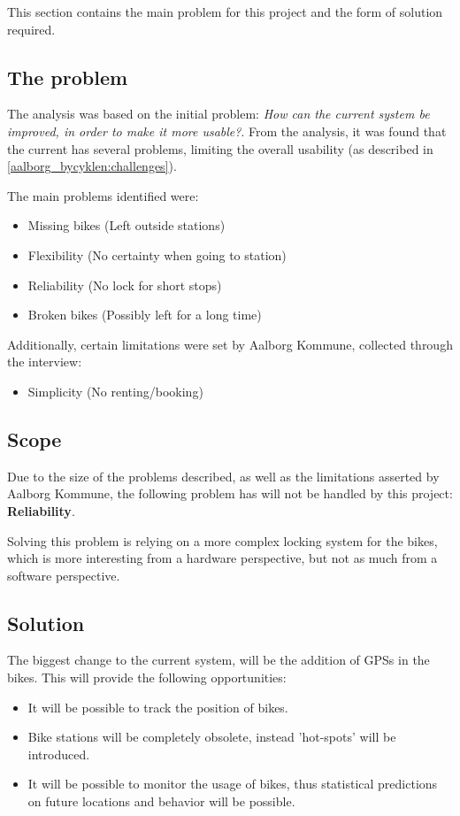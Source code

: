 This section contains the main problem for this project and the form of solution required.

\subsection{The problem}
The analysis was based on the initial problem: \textit{How can the current \citybike system be improved, in order to make it more usable?}.
From the analysis, it was found that the current \citybike has several problems, limiting the overall usability (as described in \cref{aalborg_bycyklen:challenges}).

The main problems identified were:
\begin{itemize}
\item Missing bikes (Left outside stations)
\item Flexibility (No certainty when going to station)
\item Reliability (No lock for short stops)
\item Broken bikes (Possibly left for a long time)
\end{itemize}

Additionally, certain limitations were set by Aalborg Kommune, collected through the interview:

\begin{itemize}
\item Simplicity (No renting/booking)
\end{itemize}

\subsection{Scope}
Due to the size of the problems described, as well as the limitations asserted by Aalborg Kommune, the following problem has will not be handled by this project: \textbf{Reliability}.

Solving this problem is relying on a more complex locking system for the bikes, which is more interesting from a hardware perspective, but not as much from a software perspective.

\subsection{Solution}
The biggest change to the current system, will be the addition of GPSs in the bikes.
This will provide the following opportunities:
\begin{itemize}
\item It will be possible to track the position of bikes.
\item Bike stations will be completely obsolete, instead 'hot-spots' will be introduced.
\item It will be possible to monitor the usage of bikes, thus statistical predictions on future locations and behavior will be possible.
\end{itemize}

